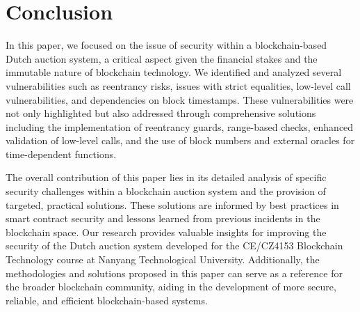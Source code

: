 \documentclass[conference]{IEEEtran}
\begin{document}
\section{Conclusion}

In this paper, we focused on the issue of security within a blockchain-based Dutch auction system, a critical aspect given the financial stakes and the immutable nature of blockchain technology. We identified and analyzed several vulnerabilities such as reentrancy risks, issues with strict equalities, low-level call vulnerabilities, and dependencies on block timestamps. These vulnerabilities were not only highlighted but also addressed through comprehensive solutions including the implementation of reentrancy guards, range-based checks, enhanced validation of low-level calls, and the use of block numbers and external oracles for time-dependent functions.

The overall contribution of this paper lies in its detailed analysis of specific security challenges within a blockchain auction system and the provision of targeted, practical solutions. These solutions are informed by best practices in smart contract security and lessons learned from previous incidents in the blockchain space. Our research provides valuable insights for improving the security of the Dutch auction system developed for the CE/CZ4153 Blockchain Technology course at Nanyang Technological University. Additionally, the methodologies and solutions proposed in this paper can serve as a reference for the broader blockchain community, aiding in the development of more secure, reliable, and efficient blockchain-based systems.


 

\end{document}
